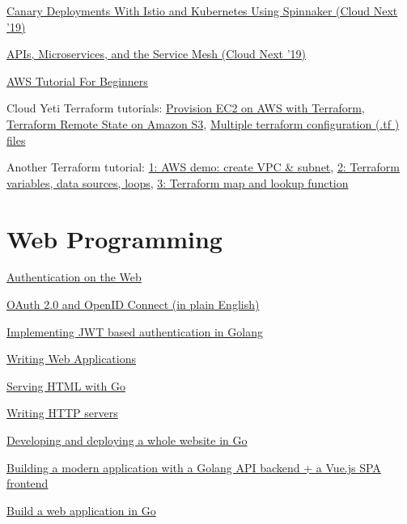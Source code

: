 \documentclass[12pt,notitlepage]{article}
\begin{document}
\href{https://www.youtube.com/watch?v=CmZWau04ZS4}{Canary Deployments With Istio and Kubernetes Using Spinnaker (Cloud Next '19)}

\href{https://www.youtube.com/watch?v=IblDMVwSSk4}{APIs, Microservices, and the Service Mesh (Cloud Next '19)}

\href{https://www.youtube.com/watch?v=MmsoIcYrXJU}{AWS Tutorial For Beginners}

Cloud Yeti Terraform tutorials: \href{https://www.youtube.com/watch?v=RA1mNClGYJ4}{Provision EC2 on AWS with Terraform},
\href{https://www.youtube.com/watch?v=rUPSyAG4C1g}{Terraform Remote State on Amazon S3},
\href{https://www.youtube.com/watch?v=YCC68iW-lKA}{Multiple terraform configuration (.tf ) files}

Another Terraform tutorial: \href{https://www.youtube.com/watch?v=IxA1IPypzHs}{1: AWS demo: create VPC \& subnet},
\href{https://www.youtube.com/watch?v=9ck6LaBy-W8}{2: Terraform variables, data sources, loops},
\href{https://www.youtube.com/watch?v=5-EvptsWl8M}{3: Terraform map and lookup function}

\section{Web Programming}

\href{https://www.youtube.com/watch?v=2PPSXonhIck}{Authentication on the Web}

\href{https://www.youtube.com/watch?v=996OiexHze0}{OAuth 2.0 and OpenID Connect (in plain English)}

\href{https://www.sohamkamani.com/blog/golang/2019-01-01-jwt-authentication/}{Implementing JWT based authentication in Golang}

\href{https://golang.org/doc/articles/wiki/}{\color{red} Writing Web Applications}

\href{https://meshstudio.io/blog/2017-11-06-serving-html-with-golang/}{Serving HTML with Go}

\href{https://medium.com/statuscode/how-i-write-go-http-services-after-seven-years-37c208122831}{Writing HTTP servers}

\href{https://juliensalinas.com/en/develop-deploy-whole-website-golang/}{Developing and deploying a whole website in Go}

\href{https://juliensalinas.com/en/golang-API-backend-vuejs-SPA-frontend-docker-modern-application/}%
{Building a modern application with a Golang API backend + a Vue.js SPA frontend}

\href{https://www.sohamkamani.com/blog/2017/09/13/how-to-build-a-web-application-in-golang/}{Build a web application in Go}
\end{document}

